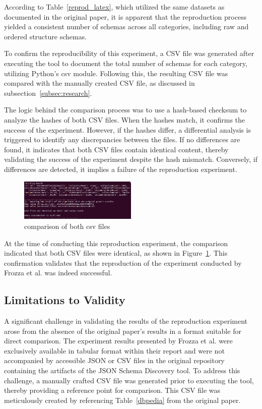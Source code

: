 \documentclass[sigconf, nonacm]{acmart}
\begin{document}
According to Table~\ref{reprod_latex}, which utilized the same datasets as documented in the original paper, it is apparent that the reproduction process yielded a consistent number of schemas across all categories, including raw and ordered structure schemas.

To confirm the reproducibility of this experiment, a CSV file was generated after executing the tool to document the total number of schemas for each category, utilizing Python's csv module. Following this, the resulting CSV file was compared with the manually created CSV file, as discussed in subsection~\ref{subsec:research}.

The logic behind the comparison process was to use a hash-based checksum to analyze the hashes of both CSV files. When the hashes match, it confirms the success of the experiment. However, if the hashes differ, a differential analysis is triggered to identify any discrepancies between the files. If no differences are found, it indicates that both CSV files contain identical content,  thereby validating the success of the experiment despite the hash mismatch. Conversely, if differences are detected, it implies a failure of the reproduction experiment.

 \begin{figure}
     \centering
     \includegraphics[height=0.2\textwidth, width=0.5\textwidth]{img/experiment.png}
     \caption{comparison of both csv files }
     \label{fig:experiment}
 \end{figure}

At the time of conducting this reproduction experiment, the comparison indicated that both CSV files were identical, as shown in Figure~\ref{fig:experiment}. This confirmation validates that the reproduction of the experiment conducted by Frozza et al. \cite{frozza2018approach} was indeed successful.

\subsection{Limitations to Validity}
A significant challenge in validating the results of the reproduction experiment arose from the absence of the original paper's results in a format suitable for direct comparison. The experiment results presented by Frozza et al. \cite{frozza2018approach} were exclusively available in tabular format within their report and were not accompanied by accessible JSON or CSV files in the original repository containing the artifacts of the JSON Schema Discovery tool. To address this challenge, a manually crafted CSV file was generated prior to executing the tool, thereby providing a reference point for comparison. This CSV file was meticulously created by referencing Table~\ref{dbpedia} from the original paper.
\end{document}
